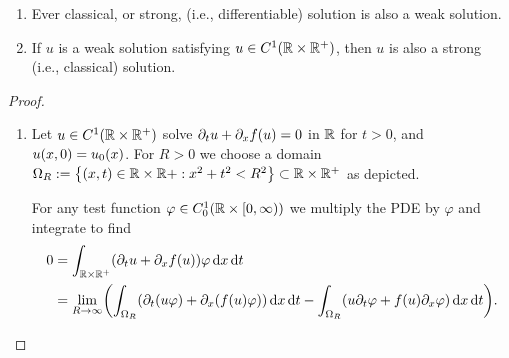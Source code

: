 \begin{theorem}
	\begin{enumerate}
		\item Ever classical, or strong, (i.e., differentiable) solution is also a weak solution.
		\item If \(u\) is a weak solution satisfying \(u \in C^1\parentheses*{\R \times \R^+}\), then \(u\) is also a strong (i.e., classical) solution.
	\end{enumerate}
\end{theorem}

\begin{proof}
	\begin{enumerate}
		\item Let \(u \in C^1\parentheses*{\R \times \R^+}\) solve \(\partial_t u + \partial_x f\parentheses*{u} = 0\) in \(\R\) for \(t > 0\), and \(u\parentheses*{x, 0} = u_0\parentheses*{x}\).
		For \(R > 0\) we choose a domain \(\Omega_R := \braces*{\parentheses*{x, t} \in \R \times \R + : x^2 + t^2 < R^2} \subset \R \times \R^+\) as depicted.
		\begin{center}
		\end{center}
		For any test function \(\varphi \in C_0^1\parentheses*{\R \times \left[0, \infty\right)}\) we multiply the PDE by \(\varphi\) and integrate to find
		\begin{align*}
			0 &= \int_{\R \times \R^+}\parentheses*{\partial_t u + \partial_x f\parentheses*{u}}\varphi\d x\d t\\
			&= \lim_{R \to \infty}\parentheses*{\int_{\Omega_R}\parentheses*{\partial_t\parentheses*{u\varphi} + \partial_x\parentheses*{f\parentheses*{u}\varphi}}\d x\d t - \int_{\Omega_R} \parentheses*{u\partial_t \varphi + f\parentheses*{u}\partial_x \varphi}\d x\d t}.

\end{align*}
\end{enumerate}
\end{proof}
